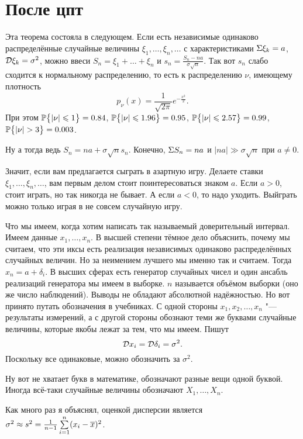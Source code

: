 \section{После цпт}
Эта теорема состояла в следующем. Если есть независимые одинаково распределённые случайные величины $\xi_1,\dots,\xi_n,\dots$ с характеристиками $\E\xi_k = a$, $\D \xi_k = \sigma^2$, можно ввеси $S_n = \xi_1+\dots+\xi_n$ и $s_n = \frac{ S_n - na}{\sigma\sqrt{n}}$. Так вот $s_n$ слабо сходится к нормальному распределению, то есть к распределению $\nu$, имеющему плотность
\[
  p_\nu(x) = \frac1{\sqrt{2\pi}}e^{-\frac{x^2}2}.
\]
При этом $\P\big\{|\nu|\le 1\big\} = 0.84$, $\P\big\{|\nu|\le 1.96\big\} = 0.95$, $\P\big\{|\nu|\le 2.57\big\} = 0.99$, $\P\big\{|\nu|>3\big\} = 0.003$.

Ну а тогда ведь $S_n = na + \sigma\sqrt{n} s_n$. Конечно, $\E S_n = na$ и $|na|\gg \sigma\sqrt n$ при $a\ne 0$.

Значит, если вам предлагается сыграть в азартную игру. Делаете ставки $\xi_1,\dots, \xi_n,\dots$, вам первым делом стоит поинтересоваться знаком $a$. Если $a>0$, стоит играть, но так никогда не бывает. А если $a<0$, то надо уходить. Выйграть можно только играя в не совсем случайную игру.

Что мы имеем, когда хотим написать так называемый доверительный интервал. Имеем данные $x_1,\dots, x_n$. В высшей степени тёмное дело объяснить, почему мы считаем, что эти иксы есть реализация независимых одинаково распределённых случайных величин. Но за неимением лучшего мы именно так и считаем. Тогда $x_n = a + \delta_i$. В высших сферах есть генератор случайных чисел и один ансабль реализаций генератора мы имеем в выборке. $n$ называется объёмом выборки (оно же число наблюдений). Выводы не обладают абсолютной надёжностью. Но вот принято путать обозначения в учебниках. С одной стороны $x_1,x_2,\dots,x_n$ "--- результаты измерений, а с другой стороны обознают теми же буквами случайные величины, которые якобы лежат за тем, что мы имеем. Пишут
\[
  \D x_i = \D \delta_i = \sigma^2.
\]
Поскольку все одинаковые, можно обозначить за $\sigma^2$.

Ну вот не хватает букв в математике, обозначают разные вещи одной буквой. Иногда всё-таки случайные величины обозначают $X_1,\dots, X_n$.

Как много раз я объяснял, оценкой дисперсии является $\sigma^2 \approx s^2 = \frac1{n-1} \RY i1n(x_i-\ol x)^2$.

